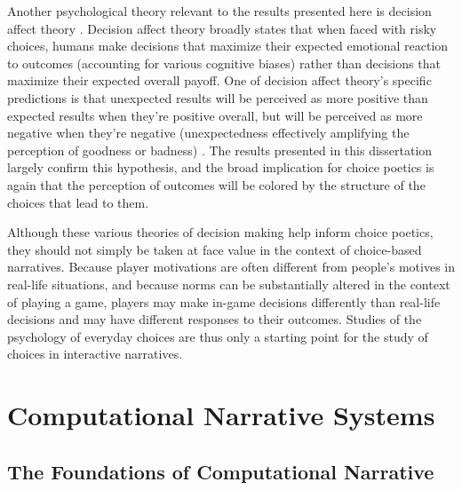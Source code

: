 Another psychological theory relevant to the results presented here is decision affect theory \citep{Mellers1997,Mellers1999}.
%
Decision affect theory broadly states that when faced with risky choices, humans make decisions that maximize their expected emotional reaction to outcomes (accounting for various cognitive biases) rather than decisions that maximize their expected overall payoff.
%
One of decision affect theory's specific predictions is that unexpected results will be perceived as more positive than expected results when they're positive overall, but will be perceived as more negative when they're negative (unexpectedness effectively amplifying the perception of goodness or badness) \citep{Shepperd2002}.
%
The results presented in this dissertation largely confirm this hypothesis, and the broad implication for choice poetics is again that the perception of outcomes will be colored by the structure of the choices that lead to them.


Although these various theories of decision making help inform choice poetics, they should not simply be taken at face value in the context of choice-based narratives.
%
Because player motivations are often different from people's motives in real-life situations, and because norms can be substantially altered in the context of playing a game, players may make in-game decisions differently than real-life decisions and may have different responses to their outcomes.
%
Studies of the psychology of everyday choices are thus only a starting point for the study of choices in interactive narratives.



\section{Computational Narrative Systems}

\subsection{The Foundations of Computational Narrative}

